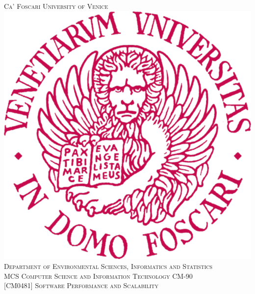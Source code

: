 \documentclass[12pt, twoside]{report}
\begin{document}

	\begin{titlepage}

		\renewcommand{\thesection}{\arabic{section}}
		\newcommand{\HRule}{\rule{\linewidth}{0.2mm}}
		
		\center
		
		
		\textsc{\Large Ca' Foscari University of Venice }\\[1.0cm]
		\includegraphics[scale=1]{ unive-emblem.png }\\[1cm]
		\textsc{\Large Department of Environmental Sciences, Informatics and Statistics }\\[0.5cm]
		\textsc{\large MCS Computer Science and Information Technology CM-90 }\\[0.5cm]
		\textsc{\large [CM0481] Software Performance and Scalability }\\[0.5cm]
		
		

\end{titlepage}
\end{document}
